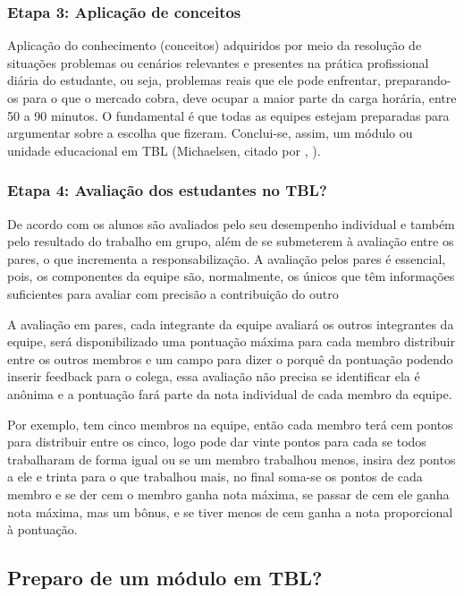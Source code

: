 \subsubsection{Etapa 3: Aplicação de conceitos}

Aplicação do conhecimento (conceitos) adquiridos por meio da resolução de situações problemas ou cenários relevantes e presentes na prática profissional diária do estudante, ou seja, problemas reais que ele pode enfrentar, preparando-os para o que o mercado cobra, deve ocupar a maior parte da carga horária, entre 50 a 90 minutos. O fundamental é que todas as equipes estejam preparadas para argumentar sobre a escolha que fizeram. Conclui-se, assim, um módulo ou unidade educacional em TBL (Michaelsen, citado por \citeauthor{bollela}, \citeyear{bollela}).

\subsubsection{Etapa 4: Avaliação dos estudantes no TBL?}

De acordo com \cite{bollela} os alunos são avaliados pelo seu desempenho individual e também pelo resultado do trabalho em grupo, além de se submeterem à avaliação entre os pares, o que incrementa a responsabilização. A avaliação pelos pares é essencial, pois, os componentes da equipe são, normalmente, os únicos que têm informações suficientes para avaliar com precisão a contribuição do outro

A avaliação em pares, cada integrante da equipe avaliará os outros integrantes da equipe, será disponibilizado uma pontuação máxima para cada membro distribuir entre os outros membros e um campo para dizer o porquê da pontuação podendo inserir feedback para o colega, essa avaliação não precisa se identificar ela é anônima e a pontuação fará parte da nota individual de cada membro da equipe.

Por exemplo, tem cinco membros na equipe, então cada membro terá cem pontos para distribuir entre os cinco, logo pode dar vinte pontos para cada se todos trabalharam de forma igual ou se um membro trabalhou menos, insira dez pontos a ele e trinta para o que trabalhou mais, no final soma-se os pontos de cada membro e se der cem o membro ganha nota máxima, se passar de cem ele ganha nota máxima, mas um bônus, e se tiver menos de cem ganha a nota proporcional à pontuação.

\subsection{Preparo de um módulo em TBL?}

